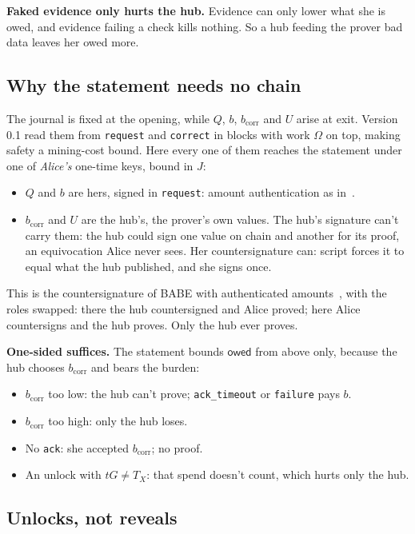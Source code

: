 \documentclass[11pt]{article}
\theoremstyle{plain}
\theoremstyle{definition}
\newcommand{\bcorr}{b_{\mathrm{corr}}}
\newcommand{\tx}[1]{\texttt{#1}}
\newcommand{\owed}{\mathsf{owed}}
\begin{document}
\textbf{Faked evidence only hurts the hub.} Evidence can only lower what
she is owed, and evidence failing a check kills nothing. So a hub
feeding the prover bad data leaves her owed more.

\subsection{Why the statement needs no chain}\label{sec:nochain}

The journal is fixed at the opening, while $Q$, $b$, $\bcorr$ and $U$
arise at exit. Version 0.1 read them from \tx{request} and \tx{correct}
in blocks with work $\Omega$ on top, making safety a mining-cost bound.
Here every one of them reaches the statement under one of \emph{Alice's}
one-time keys, bound in $J$:
\begin{itemize}[nosep]
\item $Q$ and $b$ are hers, signed in \tx{request}: amount
  authentication as in~\cite{lichen}.
\item $\bcorr$ and $U$ are the hub's, the prover's own values. The
  hub's signature can't carry them: the hub could sign one value on
  chain and another for its proof, an equivocation Alice never sees.
  Her countersignature can: script forces it to equal what the hub
  published, and she signs once.
\end{itemize}
This is the countersignature of BABE with authenticated
amounts~\cite{lichen,delving}, with the roles swapped: there the hub
countersigned and Alice proved; here Alice countersigns and the hub
proves. Only the hub ever proves.

\textbf{One-sided suffices.} The statement bounds $\owed$ from above
only, because the hub chooses $\bcorr$ and bears the burden:
\begin{itemize}[nosep]
\item $\bcorr$ too low: the hub can't prove; \tx{ack\_timeout} or
  \tx{failure} pays $b$.
\item $\bcorr$ too high: only the hub loses.
\item No \tx{ack}: she accepted $\bcorr$; no proof.
\item An unlock with $tG \ne T_X$: that spend doesn't count, which hurts
  only the hub.
\end{itemize}

\subsection{Unlocks, not reveals}\label{sec:unlocks}
\end{document}
